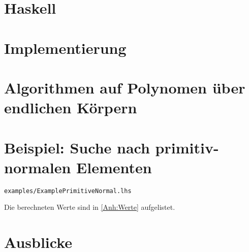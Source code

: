 \documentclass[ngerman
  ,fontsize=11pt %
  ,numbers=noenddot %
  ,parskip=half*
  ,openany
  ,DIV=10
  ,fleqn %
  ,oneside
  ,DIV=10
]{./myClass}
\begin{document}
\ifnum{}
  \frontmatter
  
  \newpage \thispagestyle{empty} \mbox{}
\else
  \mainmatter
\fi

\tableofcontents{}


\ifnum{}
  \mainmatter
\fi

%

\chapter{Haskell}


\chapter{Implementierung}








\chapter{Algorithmen auf Polynomen über endlichen Körpern}
\label{chap:algs}





%
\chapter{Beispiel: Suche nach primitiv-normalen Elementen}
\label{chap:bsp-prim-norm}
\texttt{examples/ExamplePrimitiveNormal.lhs}


Die berechneten Werte sind in \autoref{Anh:Werte} aufgelistet.


\chapter{Ausblicke}


\pagebreak
\appendix
{}



\pagebreak
\printbibliography



\end{document}
